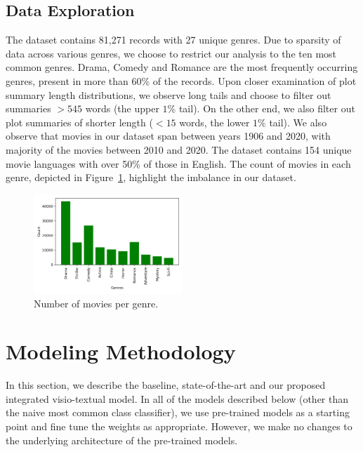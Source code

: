 \documentclass[10pt]{article}
\begin{document}
\subsection{Data Exploration}
\label{sec:DataExploration}
The dataset contains 81,271 records with 27 unique genres. Due to sparsity of data across various genres, we choose to restrict our analysis to the ten most common genres. Drama, Comedy and Romance are the most frequently occurring genres, present in more than 60\% of the records. Upon closer examination of plot summary length distributions, we observe long tails and choose to filter out summaries $>545$ words (the upper $1\%$ tail). On the other end, we also filter out plot summaries of shorter length ($<15$ words, the lower $1\%$ tail). We also observe that movies in our dataset span between years 1906 and 2020, with majority of the movies between 2010 and 2020. The dataset contains 154 unique movie languages with over 50\% of those in English. The count of movies in each genre, depicted in Figure~\ref{fig:genrehist}, highlight the imbalance in our dataset.

\vspace{2.0mm}
\begin{figure}[!h]
  \centering
  \includegraphics[width=0.5\textwidth]{images/GenreCount.png}
  \caption{Number of movies per genre.}
  \label{fig:genrehist}
\end{figure}

\section{Modeling Methodology}

In this section, we describe the baseline, state-of-the-art and our proposed integrated visio-textual model. In all of the models described below (other than the naive most common class classifier), we use pre-trained models as a starting point and fine tune the weights as appropriate. However, we make no changes to the underlying architecture of the pre-trained models.
\end{document}
